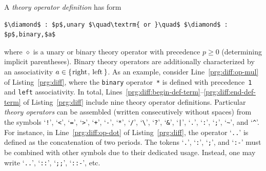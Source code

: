 \documentclass[a4paper,USenglish]{oasics-v2016}
\begin{document}
A \emph{theory operator definition} has form
\begin{lstlisting}[numbers=none,mathescape=t]
$\diamond$ : $p$,unary $\quad\textrm{ or }\quad$ $\diamond$ : $p$,binary,$a$
\end{lstlisting}
where $\diamond$ is a unary or binary theory operator with precedence $p\geq 0$
(determining implicit parentheses). %
Binary theory operators are additionally characterized by an associativity
$a\in\{\text{\lstinline{right}},\linebreak[1]\text{\lstinline{left}}\}$.
%
As an example,
consider Line~\ref{prg:diff:op-mul} of Listing~\ref{prg:diff},
where the \lstinline{binary} operator~\lstinline{*} is defined with precedence~\lstinline{1} and \lstinline{left} associativity.
%
In total, Lines~\ref{prg:diff:begin-def-term}--\ref{prg:diff:end-def-term} of Listing~\ref{prg:diff}
include nine theory operator definitions.
%
Particular \emph{theory operators} can be assembled (written consecutively without spaces) from the symbols
`\lstinline{!}',
`\lstinline{<}',
`\lstinline{=}',
`\lstinline{>}',
`\lstinline{+}',
`\lstinline{-}',
`\lstinline{*}',
`\lstinline{/}',
`\lstinline{\}',
`\lstinline{?}',
`\lstinline{&}',
%
`\lstinline{|}',
`\lstinline{.}',
`\lstinline{:}',
`\lstinline{;}',
`\lstinline{~}', and
`\lstinline{^}'.
%
For instance,
in Line~\ref{prg:diff:op-dot} of Listing~\ref{prg:diff}, the operator `\lstinline{..}' is defined as the concatenation of two periods.
%
%
The tokens
`\lstinline{.}',
`\lstinline{:}',
`\lstinline{;}', and
`\lstinline{:-}'
must be combined with other symbols
due to their dedicated usage.
Instead, one may write
`\lstinline{..}',
`\lstinline{::}',
`\lstinline{;;}',
`\lstinline{::-}',
etc.
\end{document}
